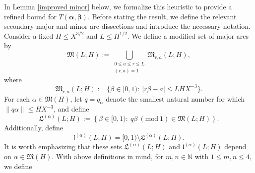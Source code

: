 \documentclass{amsart}%
\numberwithin{equation}{section}
\theoremstyle{remark}
\newcommand{\R}{\mathbb{R}}
\newcommand{\1}{\mathbbm{1}}
\begin{document}
In Lemma \ref{improved minor} below, we formalize this heuristic to provide a refined bound for $T(\boldsymbol{\alpha},\boldsymbol{\beta})$. Before stating the result, we define the relevant secondary major and minor arc dissections and introduce the necessary notation. 
Consider a fixed $H \le X^{3/2}$ and $L \le H^{1/2}$.
We define a modified set of major arcs by
\begin{equation*}
\mathfrak{M}(L;H):=\bigcup_{\substack{0\leq a\leq r\leq L\\ (r,a)=1}}\mathfrak{M}_{r,a}(L;H),
\end{equation*}
    where 
    \begin{equation*}
        \mathfrak{M}_{r,a}(L;H):=\{\beta\in [0,1):\ |r\beta-a|\leq LHX^{-3}\}.
    \end{equation*}
For each $\alpha \in \mathfrak{M}(H)$, let $q=q_{\alpha}$ denote the smallest natural number for which $\|q\alpha\|\leq HX^{-3}$, and define %
\begin{equation*}
    \mathfrak{L}^{(\alpha)}(L;H):=\left\{\beta\in [0,1):\ q\beta \ (\text{mod}\ 1) \in \mathfrak{M}(L;H)\right\}.
\end{equation*}
Additionally, define 
\begin{equation}\label{secondary minor arcs}
 \mathfrak{l}^{(\alpha)}(L; H)=[0,1)\setminus \mathfrak{L}^{(\alpha)}(L; H).   
\end{equation} It is worth emphasizing that these sets $\mathfrak{L}^{(\alpha)}(L; H)$ and $\mathfrak{l}^{(\alpha)}(L; H)$ depend on $\alpha\in \mathfrak{M}(H).$ 
With above definitions in mind, for $m,n\in \mathbb{N}$ with $1\leq m,n\leq 4,$ we define
\end{document}
